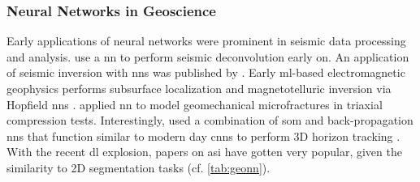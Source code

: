 \subsubsection{Neural Networks in Geoscience}
Early applications of neural networks were prominent in seismic data processing and analysis. \citet{Zhao1988-hu} use a \ac{nn} to perform seismic deconvolution early on. An application of seismic inversion with \acp{nn} was published by \citet{Roth1994-na}. Early \ac{ml}-based electromagnetic geophysics performs subsurface localization \citep{Poulton1992-ft} and magnetotelluric inversion via Hopfield \acp{nn} \citep{Zhang1997-yp}. \citet{Feng1998-ck} applied \ac{nn} to model geomechanical microfractures in triaxial compression tests. Interestingly, \citet{Legget1996-nk} used a combination of \acf{som} and back-propagation \acp{nn} that function similar to modern day \acfp{cnn} to perform 3D horizon tracking \citep{Leggett2003-vq}. With the recent \ac{dl} explosion, papers on \acf{asi} have gotten very popular, given the similarity to 2D segmentation tasks (cf. \cref{tab:geonn}).

\clearpage
\newpage

